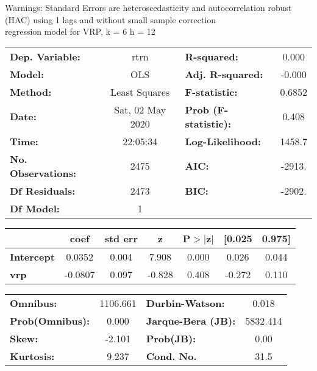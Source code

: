 Warnings: \newline
 [1] Standard Errors are heteroscedasticity and autocorrelation robust (HAC) using 1 lags and without small sample correction\\ 

regression model for VRP, k = 6 h = 12\begin{center}
\begin{tabular}{lclc}
\toprule
\textbf{Dep. Variable:}    &       rtrn       & \textbf{  R-squared:         } &     0.000   \\
\textbf{Model:}            &       OLS        & \textbf{  Adj. R-squared:    } &    -0.000   \\
\textbf{Method:}           &  Least Squares   & \textbf{  F-statistic:       } &    0.6852   \\
\textbf{Date:}             & Sat, 02 May 2020 & \textbf{  Prob (F-statistic):} &    0.408    \\
\textbf{Time:}             &     22:05:34     & \textbf{  Log-Likelihood:    } &    1458.7   \\
\textbf{No. Observations:} &        2475      & \textbf{  AIC:               } &    -2913.   \\
\textbf{Df Residuals:}     &        2473      & \textbf{  BIC:               } &    -2902.   \\
\textbf{Df Model:}         &           1      & \textbf{                     } &             \\
\bottomrule
\end{tabular}
\begin{tabular}{lcccccc}
                   & \textbf{coef} & \textbf{std err} & \textbf{z} & \textbf{P$> |$z$|$} & \textbf{[0.025} & \textbf{0.975]}  \\
\midrule
\textbf{Intercept} &       0.0352  &        0.004     &     7.908  &         0.000        &        0.026    &        0.044     \\
\textbf{vrp}       &      -0.0807  &        0.097     &    -0.828  &         0.408        &       -0.272    &        0.110     \\
\bottomrule
\end{tabular}
\begin{tabular}{lclc}
\textbf{Omnibus:}       & 1106.661 & \textbf{  Durbin-Watson:     } &    0.018  \\
\textbf{Prob(Omnibus):} &   0.000  & \textbf{  Jarque-Bera (JB):  } & 5832.414  \\
\textbf{Skew:}          &  -2.101  & \textbf{  Prob(JB):          } &     0.00  \\
\textbf{Kurtosis:}      &   9.237  & \textbf{  Cond. No.          } &     31.5  \\
\bottomrule
\end{tabular}
\end{center}

